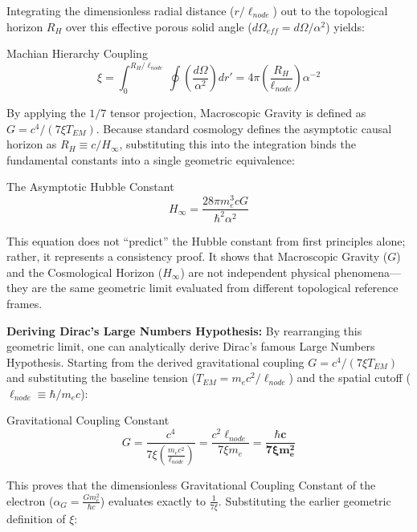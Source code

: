 Integrating the dimensionless radial distance ($r/\ell_{node}$) out to the topological horizon $R_{H}$ over this effective porous solid angle ($d\Omega_{eff}=d\Omega/\alpha^{2}$) yields:

\begin{resultbox}{Machian Hierarchy Coupling}
\begin{equation}
\xi=\int_{0}^{R_{H}/\ell_{node}}\oint\left(\frac{d\Omega}{\alpha^{2}}\right)dr'=4\pi\left(\frac{R_{H}}{\ell_{node}}\right)\alpha^{-2}
\end{equation}
\end{resultbox}

By applying the $1/7$ tensor projection, Macroscopic Gravity is defined as $G=c^{4}/(7\xi T_{EM})$. Because standard cosmology defines the asymptotic causal horizon as $R_{H}\equiv c/H_{\infty}$, substituting this into the integration binds the fundamental constants into a single geometric equivalence:

\begin{resultbox}{The Asymptotic Hubble Constant}
\begin{equation}
H_{\infty}=\frac{28\pi m_{e}^{3}cG}{\hbar^{2}\alpha^{2}}
\end{equation}
\end{resultbox}

This equation does not ``predict'' the Hubble constant from first principles alone; rather, it represents a consistency proof. It shows that Macroscopic Gravity ($G$) and the Cosmological Horizon ($H_{\infty}$) are not independent physical phenomena---they are the same geometric limit evaluated from different topological reference frames.

\textbf{Deriving Dirac's Large Numbers Hypothesis:} By rearranging this geometric limit, one can analytically derive Dirac's famous Large Numbers Hypothesis. Starting from the derived gravitational coupling $G=c^{4}/(7\xi T_{EM})$ and substituting the baseline tension ($T_{EM}=m_{e}c^{2}/\ell_{node}$) and the spatial cutoff ($\ell_{node}\equiv\hbar/m_{e}c$):

\begin{resultbox}{Gravitational Coupling Constant}
\begin{equation}
G=\frac{c^{4}}{7\xi\left(\frac{m_{e}c^{2}}{\ell_{node}}\right)}=\frac{c^{2}\ell_{node}}{7\xi m_{e}}=\mathbf{\frac{\hbar c}{7\xi m_{e}^{2}}}
\end{equation}
\end{resultbox}

This proves that the dimensionless Gravitational Coupling Constant of the electron ($\alpha_{G}=\frac{Gm_{e}^{2}}{\hbar c}$) evaluates exactly to $\frac{1}{7\xi}$. Substituting the earlier geometric definition of $\xi$:


